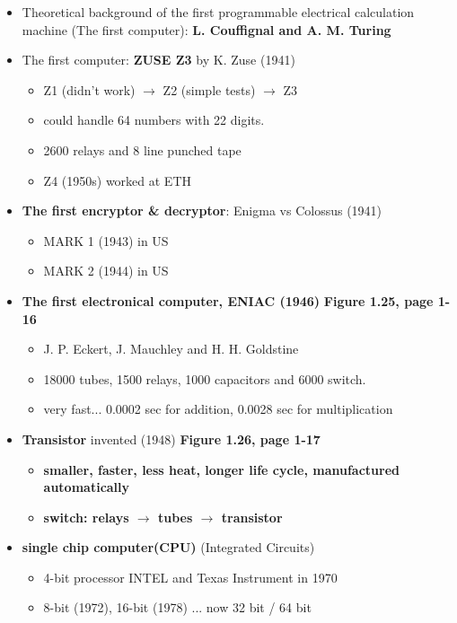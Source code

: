 \documentclass{standalone}
\begin{document}
\begin{itemize}
	\item Theoretical background of the first programmable electrical calculation machine (The first computer): \textbf{L. Couffignal and A. M. Turing}
	\item The first computer: \textbf{ZUSE Z3} by K. Zuse (1941)
		\begin{itemize}
			\item Z1 (didn't work) $\rightarrow$ Z2 (simple tests) $\rightarrow$ Z3 
			\item could handle 64 numbers with 22 digits. 
			\item 2600 relays and 8 line punched tape
			\item Z4 (1950s) worked at ETH 
		\end{itemize}	
	\item \textbf{The first encryptor \& decryptor}: Enigma vs Colossus (1941)
		\begin{itemize}
			\item MARK 1 (1943) in US
			\item MARK 2 (1944) in US
		\end{itemize} 
	\item \textbf{The first electronical computer, ENIAC (1946)} \textbf{Figure 1.25, page 1-16}
		\begin{itemize}
			\item J. P. Eckert, J. Mauchley and H. H. Goldstine
			\item 18000 tubes, 1500 relays, 1000 capacitors and 6000 switch.
			\item very fast... 0.0002 sec for addition, 0.0028 sec for multiplication 
		\end{itemize}
	\item \textbf{Transistor} invented (1948) \textbf{Figure 1.26, page 1-17}
		\begin{itemize}
			\item \textbf{smaller, faster, less heat, longer life cycle, manufactured automatically}
			\item \textbf{switch: relays $\rightarrow$ tubes $\rightarrow$ transistor}
		\end{itemize}   
	\item \textbf{single chip computer(CPU)} (Integrated Circuits) 
		\begin{itemize}
			\item 4-bit processor INTEL and Texas Instrument in 1970
			\item 8-bit (1972), 16-bit (1978) ... now 32 bit / 64 bit

\end{itemize}
\end{itemize}
\end{document}
